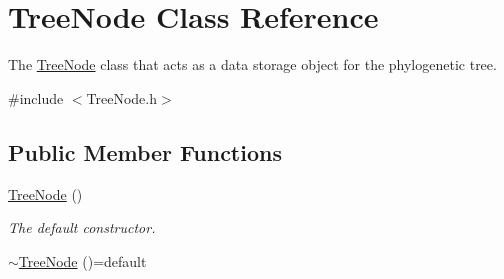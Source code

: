 \hypertarget{class_tree_node}{}\section{Tree\+Node Class Reference}
\label{class_tree_node}


The \hyperlink{class_tree_node}{Tree\+Node} class that acts as a data storage object for the phylogenetic tree.  




{\ttfamily \#include $<$Tree\+Node.\+h$>$}

\subsection*{Public Member Functions}
\begin{DoxyCompactItemize}
\item 
\hyperlink{class_tree_node_a984a98d5ccf7ef1f5a18094c6821f35d}{Tree\+Node} ()\hypertarget{class_tree_node_a984a98d5ccf7ef1f5a18094c6821f35d}{}\label{class_tree_node_a984a98d5ccf7ef1f5a18094c6821f35d}

\begin{DoxyCompactList}\small\item\em The default constructor. \end{DoxyCompactList}\item 
\hyperlink{class_tree_node_a89eb1eb0e25fccaa83c780b85f95b570}{$\sim$\+Tree\+Node} ()=default\hypertarget{class_tree_node_a89eb1eb0e25fccaa83c780b85f95b570}{}\label{class_tree_node_a89eb1eb0e25fccaa83c780b85f95b570}


\end{DoxyCompactItemize}
